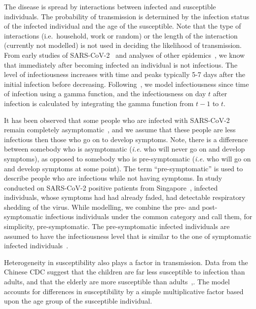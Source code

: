 \documentclass[11pt, oneside]{amsart}   	%
\begin{document}
The disease is spread by interactions between infected and susceptible individuals.
The probability of transmission is determined by the infection status of the infected individual and the age of the susceptible.
Note that the type of interactions (i.e.\ household, work or random) or the length of the interaction (currently not modelled) is not used in deciding the likelihood of transmission.
From early studies of SARS-CoV-2~\citep{lai2020severe,guan2020clinical} and analyses of other epidemics~\citep{chan2003sars,meltzer2004multiple}, we know that immediately after becoming infected an individual is not infectious.
The level of infectiousness increases with time and peaks typically 5-7 days after the initial infection before decreasing.  
Following~\citep{ferretti2020quantifying}, we model infectiousness since time of infection using a gamma function, and the infectiousness on day $t$ after infection is calculated by integrating the gamma function from $t-1$ to $t$.

It has been observed that some people who are infected with SARS-CoV-2 remain completely asymptomatic~\citep{bai2020presumed}, and we assume that these people are less infectious then those who go on to develop symptoms. 
Note, there is a difference between somebody who is asymptomatic (\emph{i.e.} who will never go on and develop symptoms), as opposed to somebody who is pre-symptomatic (\emph{i.e.} who will go on and develop symptoms at some point). 
The term ``pre-symptomatic'' is used to describe people who are infectious while not having symptoms. 
In study conducted on SARS-CoV-2 positive patients from Singapore~\citep{young2020epidemiologic}, infected individuals, whose symptoms had had already faded, had detectable respiratory shedding of the virus. 
While modelling, we combine the pre- and post-symptomatic infectious individuals under the common category and call them, for simplicity, pre-symptomatic. 
The pre-symptomatic infected individuals are assumed to have the infectiousness level that is similar to the one of symptomatic infected individuals~\citep{young2020epidemiologic,rothe2020transmission}.

Heterogeneity in susceptibility also plays a factor in transmission. 
Data from the Chinese CDC suggest that the children are far less susceptible to infection than adults, and that the elderly are more susceptible than adults~\citep{chinavital},.  
The model accounts for differences in susceptibility by a simple multiplicative factor based upon the age group of the susceptible individual.
\end{document}
